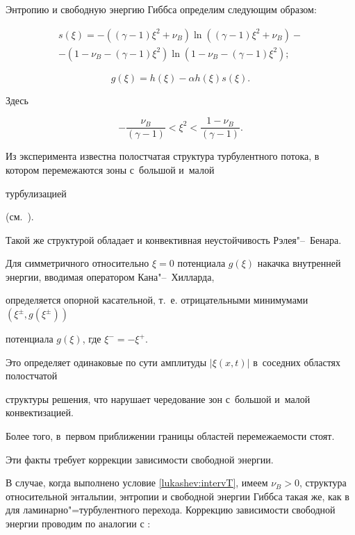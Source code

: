 Энтропию и свободную энергию Гиббса определим следующим образом:

\begin{multline}

s(\xi)=-\left((\gamma-1)\xi^2+\nu_B\right) \ln\left((\gamma-1)\xi^2+\nu_B\right)-\\

-\left(1-\nu_B-(\gamma-1)\xi^2\right) \ln\left(1-\nu_B-(\gamma-1)\xi^2\right);

\end{multline}

$$

g(\xi)=h(\xi)-\alpha h(\xi) s(\xi).

$$

Здесь

$$

-\frac{\nu_B}{(\gamma-1)}<\xi^2<\frac{1-\nu_B}{(\gamma-1)}.

$$



Из эксперимента известна полостчатая структура турбулентного потока, в котором перемежаются зоны с~большой и~малой

турбулизацией 

(см.~\cite{lukashev:bib35,lukashev:bib36}).  

Такой же структурой обладает и конвективная неустойчивость Рэлея"--~Бенара.

Для симметричного относительно $\xi=0$ потенциала $g(\xi)$ накачка внутренней энергии, вводимая оператором Кана"--~Хилларда, %

определяется опорной касательной, т.~е. отрицательными минимумами $(\xi^\pm, g(\xi^\pm))$

потенциала $g(\xi)$, где $\xi^-=-\xi^+$. 

Это определяет одинаковые по сути амплитуды $|\xi(x,t)|$ в~соседних областях полостчатой

структуры решения, что нарушает чередование зон с~большой и~малой конвектизацией. 

Более того, в~первом приближении границы областей перемежаемости стоят.  

Эти факты требует коррекции зависимости свободной энергии.



В случае, когда выполнено условие \eqref{lukashev:intervT}, имеем $\nu_B>0$, структура относительной энтальпии, энтропии и свободной энергии Гиббса такая же, как в~\cite{lukashev:bib50} для ламинарно"=турбулентного перехода. Коррекцию зависимости свободной энергии проводим по аналогии с \cite{lukashev:bib50}:

